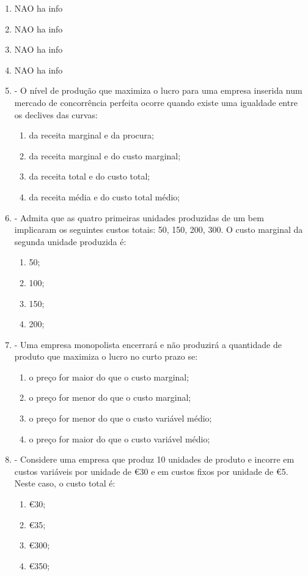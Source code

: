 \documentclass[11pt]{article}
\begin{document}
\begin{enumerate}
\item NAO ha info
\item NAO ha info
\item NAO ha info
\item NAO ha info

\item - O nível de produção que maximiza o lucro para uma empresa inserida num mercado de concorrência perfeita ocorre quando existe uma igualdade entre os declives das curvas: 
\begin{enumerate}
\item da receita marginal e da procura;
\item da receita marginal e do custo marginal;
\item da receita total e do custo total;
\item da receita média e do custo total médio;
\end{enumerate}

\clearpage
\item - Admita que as quatro primeiras unidades produzidas de um bem implicaram os seguintes custos totais: 50, 150, 200, 300. O custo marginal da segunda unidade produzida é: 
\begin{enumerate}
\item 50;
\item 100;
\item 150;
\item 200;
\end{enumerate}

\item - Uma empresa monopolista encerrará e não produzirá a quantidade de produto que maximiza o lucro no curto prazo se: 
\begin{enumerate}
\item o preço for maior do que o custo marginal;
\item o preço for menor do que o custo marginal;
\item o preço for menor do que o custo variável médio;
\item o preço for maior do que o custo variável médio;
\end{enumerate}

\item - Considere uma empresa que produz 10 unidades de produto e incorre em custos variáveis por unidade de €30 e em custos fixos por unidade de €5. Neste caso, o custo total é: 
\begin{enumerate}
\item €30;
\item €35;
\item €300;
\item €350;
\end{enumerate}


\end{enumerate}
\end{document}
